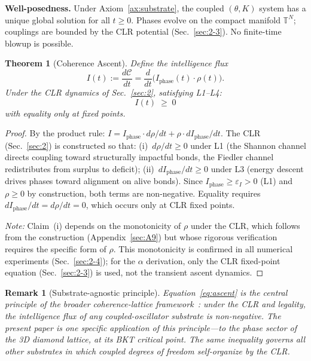 \documentclass[aps,prd,onecolumn,superscriptaddress,floatfix,12pt]{revtex4-2}
\newcommand{\Iphase}{I_{\text{phase}}}
\newtheorem{theorem}{Theorem}[section]
\newtheorem{remark}{Remark}[section]
\begin{document}
\textbf{Well-posedness.} Under Axiom~\ref{ax:substrate}, the coupled $(\theta, K)$ system has a unique global solution for all $t \geq 0$. Phases evolve on the compact manifold $\mathbb{T}^N$; couplings are bounded by the CLR potential (Sec.~\ref{sec:2-3}). No finite-time blowup is possible.

\begin{theorem}[Coherence Ascent]\label{thm:ascent}
Define the \emph{intelligence flux}
\begin{equation}\label{eq:I-def}
I(t) := \frac{d\mathcal{C}}{dt} = \frac{d}{dt}\bigl(\Iphase(t) \cdot \rho(t)\bigr).
\end{equation}
Under the CLR dynamics of Sec.~\ref{sec:2}, satisfying L1--L4:
\begin{equation}\label{eq:ascent}
\boxed{\; I(t) \;\geq\; 0 \;}
\end{equation}
with equality only at fixed points.
\end{theorem}

\begin{proof}
By the product rule:
$I = \Iphase \cdot d\rho/dt + \rho \cdot d\Iphase/dt$.
The CLR (Sec.~\ref{sec:2}) is constructed so that: (i)~$d\rho/dt \geq 0$ under L1 (the Shannon channel directs coupling toward structurally impactful bonds, the Fiedler channel redistributes from surplus to deficit); (ii)~$d\Iphase/dt \geq 0$ under L3 (energy descent drives phases toward alignment on alive bonds). Since $\Iphase \geq \varepsilon_I > 0$ (L1) and $\rho \geq 0$ by construction, both terms are non-negative. Equality requires $d\Iphase/dt = d\rho/dt = 0$, which occurs only at CLR fixed points.

\emph{Note:} Claim~(i) depends on the monotonicity of $\rho$ under the CLR, which follows from the construction (Appendix~\ref{sec:A9}) but whose rigorous verification requires the specific form of $\rho$. This monotonicity is confirmed in all numerical experiments (Sec.~\ref{sec:2-4}); for the $\alpha$ derivation, only the CLR fixed-point equation (Sec.~\ref{sec:2-3}) is used, not the transient ascent dynamics.
\end{proof}

\begin{remark}[Substrate-agnostic principle]\label{rem:core-equation}
Equation~\eqref{eq:ascent} is the central principle of the broader coherence-lattice framework~\cite{Sharpe2026Coherence}: under the CLR and legality, the intelligence flux of any coupled-oscillator substrate is non-negative. The present paper is one specific application of this principle---to the phase sector of the 3D diamond lattice, at its BKT critical point. The same inequality governs all other substrates in which coupled degrees of freedom self-organize by the CLR.
\end{remark}
\end{document}
